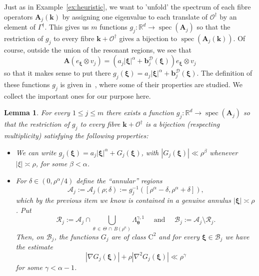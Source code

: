 \documentclass[10pt]{amsart}
\newtheorem{lemm}[theo]{Lemma}\newtheorem{prop}[theo]{Proposition}\newtheorem{coro}[theo]{Corollary}\newtheorem{conj}[theo]{Conjecture}
\theoremstyle{definition}\newtheorem{defi}[theo]{Definition}\newtheorem{rema}[theo]{Remark}\newtheorem{exam}[theo]{Example}\newtheorem{nota}[theo]{Notation}
\DeclareMathOperator{\spec}{spec}
\newcommand{\RC}{\mathrm{C}}
\newcommand{\R}{\mathbb R}
\newcommand{\CA}{\mathcal{A}}
\newcommand{\CB}{\mathcal{B}}
\newcommand{\CD}{\mathcal{D}}
\newcommand{\CO}{\mathcal{O}}
\newcommand{\CR}{\mathcal{R}}
\newcommand{\btheta}{\boldsymbol \theta}
\newcommand{\bxi}{\boldsymbol \xi}
\newcommand{\BA}{\mathbf A}
\newcommand{\bbb}{\mathbf b}
\newcommand{\bk}{\mathbf k}
\newcommand{\abs}[1]{\left\lvert #1 \right\rvert}
\begin{document}
Just as in Example~\ref{ex:heuristic}, we want to 'unfold' the spectrum of each fibre operators $\BA_j(\bk)$ by assigning one eigenvalue to each translate of $\CO^\dagger$ by an element of $\Gamma^\dagger$. This gives us $m$ functions $g_j : \R^d \to \spec(\BA_j)$ so that the restriction of $g_j$ to every fibre $\bk + \CO^\dagger$ gives a bijection to $\spec(\BA_j(\bk))$. Of course, outside the union of the resonant regions, we see that
\begin{equation}
\BA (e_{\bxi} \otimes v_j) = \left(a_j \abs \bxi^\alpha + \bbb_j^\CD(\bxi)\right) e_{\bxi} \otimes v_j
\end{equation}
so that it makes sense to put there $g_j(\bxi) = a_j \abs \bxi^\alpha +
\bbb_j^\CD(\bxi)$. The definition of these functions $g_j$ is given in~\cite[Section~7]{ParSob2010}, where some of their properties are studied. We collect the important ones for our purpose here.

\begin{lemm}\label{lem:descriptiongj}
For every $1 \le j \le m$ there exists a function $g_j : \R^d \to
\spec(\BA_j)$ so that the restriction of $g_j$ to every fibre $\bk +
\CO^\dagger$ is a bijection (respecting multiplicity) satisfying the following properties:
\begin{itemize}
\item We can write $g_j(\bxi) = a_j \abs \bxi^\alpha + G_j(\bxi)$, with $\abs{G_j(\bxi)} \ll \rho^\beta$ whenever $\abs \xi \asymp \rho$, for some $\beta < \alpha$.
\item For $\delta \in (0,\rho^\alpha/4)$ define the ``annular'' regions
\begin{equation}
\CA_j := \CA_j(\rho;\delta) := g_j^{-1}\left([\rho^\alpha - \delta,
\rho^\alpha + \delta]\right),
\end{equation}
which by the previous item we know is contained in a genuine annulus $\abs \bxi \asymp \rho$. Put
\begin{equation}
\CR_j := \CA_j \cap \bigcup_{\theta\,\in \,\Theta\,\cap\,B(\rho^\kappa)} \Lambda_{\btheta}^{\gamma,1} \quad \text{ and }
\quad
\CB_j := \CA_j \setminus \CR_j.
\end{equation}
Then, on $\CB_j$, the functions $G_j$ are of class $\RC^2$ and for every $\bxi \in \CB_j$ we have the estimate
\begin{equation}
\abs{\nabla G_j(\bxi)} + \rho \abs{\nabla^2 G_j(\bxi)} \ll
\rho^\gamma
\end{equation}
for some $\gamma< \alpha - 1$.
\end{itemize}
\end{lemm}
\end{document}
